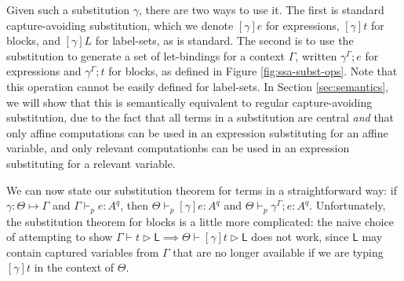 \documentclass[acmsmall,screen,review]{acmart}
\newcommand{\ms}[1]{\ensuremath{\mathsf{#1}}}
\newcommand{\hasty}[5]{#1 \vdash_{#2} #3: {#4}^{#5}}
\newcommand{\haslb}[3]{#1 \vdash #2 \rhd #3}
\newcommand{\issubst}[3]{#1: #2 \mapsto #3}
\newcommand{\exprletsubst}[2]{{#1};{#2}}
\newcommand{\stmtletsubst}[2]{{#1};{#2}}
\newcommand{\substctx}[2]{{#1}^{#2}}
\begin{document}
Given such a substitution \(\gamma\), there are two ways to use it. The first is
standard capture-avoiding substitution, which we denote \([\gamma]e\) for
expressions, \([\gamma]t\) for blocks, and \([\gamma]L\) for label-sets, as is
standard. The second is to use the substitution to generate a set of
let-bindings for a context \(\Gamma\), written
\(\exprletsubst{\substctx{\gamma}{\Gamma}}{e}\) for expressions and
\(\stmtletsubst{\substctx{\gamma}{\Gamma}}{t}\) for blocks, as defined in Figure
\ref{fig:ssa-subst-ops}. Note that this operation cannot be easily defined for
label-sets. In Section \ref{sec:semantics}, we will show that this is
semantically equivalent to regular capture-avoiding substitution, due to the
fact that all terms in a substitution are central \textit{and} that only affine
computations can be used in an expression substituting for an affine variable,
and only relevant computationbs can be used in an expression substituting
for a relevant variable.

We can now state our substitution theorem for terms in a straightforward way: if
\(\issubst{\gamma}{\Theta}{\Gamma}\) and \(\hasty{\Gamma}{p}{e}{A}{q}\), then
\(\hasty{\Theta}{p}{[\gamma]e}{A}{q}\) and
\(\hasty{\Theta}{p}{\exprletsubst{\substctx{\gamma}{\Gamma}}{e}}{A}{q}\).
Unfortunately, the substitution theorem for blocks is a little more complicated:
the naive choice of attempting to show \(\haslb{\Gamma}{t}{\ms{L}} \implies
\haslb{\Theta}{[\gamma]t}{\ms{L}}\) does not work, since \(\ms{L}\) may contain
captured variables from \(\Gamma\) that are no longer available if we are typing
\([\gamma]t\) in the context of \(\Theta\). 
\end{document}
